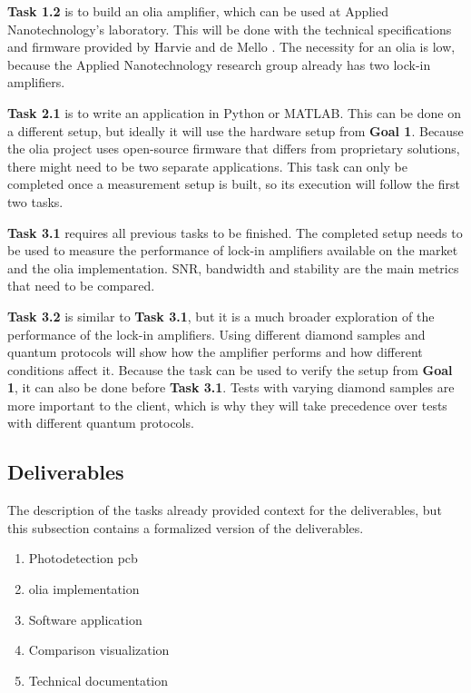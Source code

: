 \textbf{Task 1.2} is to build an \gls{olia} amplifier, which can be used at Applied Nanotechnology's laboratory. This will be done with the technical specifications and firmware provided by Harvie and de Mello \cite{harvie2023olia}. The necessity for an \gls{olia} is low, because the Applied Nanotechnology research group already has two lock-in amplifiers.

\textbf{Task 2.1} is to write an application in Python or MATLAB. This can be done on a different setup, but ideally it will use the hardware setup from \textbf{Goal 1}. Because the \gls{olia} project uses open-source firmware that differs from proprietary solutions, there might need to be two separate applications. This task can only be completed once a measurement setup is built, so its execution will follow the first two tasks.

\textbf{Task 3.1} requires all previous tasks to be finished. The completed setup needs to be used to measure the performance of lock-in amplifiers available on the market and the \gls{olia} implementation. SNR, bandwidth and stability are the main metrics that need to be compared.

\textbf{Task 3.2} is similar to \textbf{Task 3.1}, but it is a much broader exploration of the performance of the lock-in amplifiers. Using different diamond samples and quantum protocols will show how the amplifier performs and how different conditions affect it. Because the task can be used to verify the setup from \textbf{Goal 1}, it can also be done before \textbf{Task 3.1}. Tests with varying diamond samples are more important to the client, which is why they will take precedence over tests with different quantum protocols.


\subsection{Deliverables}
The description of the tasks already provided context for the deliverables, but this subsection contains a formalized version of the deliverables.

\begin{enumerate}
	\item Photodetection \gls{pcb} 
	\item \gls{olia} implementation
	\item Software application
	\item Comparison visualization
	\item Technical documentation
\end{enumerate}

